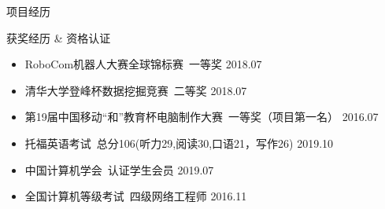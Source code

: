 \documentclass[UTF8]{resume}
\begin{document}
\begin{rSection}{项目经历}
\end{rSection}

\begin{rSection}{获奖经历 \& 资格认证}
    \begin{itemize}
        \itemsep -0.5em \vspace{-0.5em}
        \item RoboCom机器人大赛全球锦标赛~一等奖 \hfill 2018.07
        \item 清华大学登峰杯数据挖掘竞赛~二等奖 \hfill 2018.07 
        \item 第19届中国移动“和”教育杯电脑制作大赛~一等奖（项目第一名） \hfill 2016.07
        \item 托福英语考试~总分106(听力29,阅读30,口语21，写作26) \hfill 2019.10
        \item 中国计算机学会~认证学生会员 \hfill 2019.07
        \item 全国计算机等级考试~四级网络工程师 \hfill 2016.11
    \end{itemize}
\end{rSection}
\end{document}
